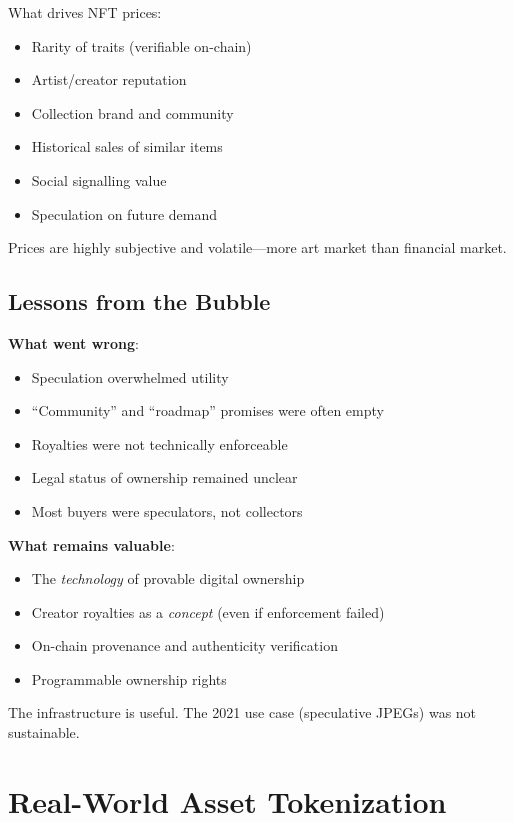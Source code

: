 \documentclass[11pt,a4paper]{article}
\begin{document}
What drives NFT prices:
\begin{itemize}
    \item Rarity of traits (verifiable on-chain)
    \item Artist/creator reputation
    \item Collection brand and community
    \item Historical sales of similar items
    \item Social signalling value
    \item Speculation on future demand
\end{itemize}

Prices are highly subjective and volatile---more art market than financial market.

\subsection{Lessons from the Bubble}

\textbf{What went wrong}:
\begin{itemize}
    \item Speculation overwhelmed utility
    \item ``Community'' and ``roadmap'' promises were often empty
    \item Royalties were not technically enforceable
    \item Legal status of ownership remained unclear
    \item Most buyers were speculators, not collectors
\end{itemize}

\textbf{What remains valuable}:
\begin{itemize}
    \item The \textit{technology} of provable digital ownership
    \item Creator royalties as a \textit{concept} (even if enforcement failed)
    \item On-chain provenance and authenticity verification
    \item Programmable ownership rights
\end{itemize}

The infrastructure is useful. The 2021 use case (speculative JPEGs) was not sustainable.

\section{Real-World Asset Tokenization}
\end{document}
